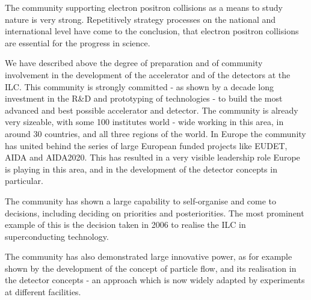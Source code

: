 \documentclass[%
 reprint,
 amsmath,amssymb,
 aps,
]{revtex4-1}
\begin{document}
The community supporting electron positron collisions as a means to study nature is very strong. Repetitively strategy processes on the national and international level have come to the conclusion, that electron positron collisions are essential for the progress in science. 

We have described above the degree of preparation and of community involvement in the development of the accelerator and of the detectors at the ILC. This community is strongly committed - as shown by a decade long investment in the R\&D and prototyping of technologies - to build the most advanced and best possible accelerator and detector. The community is already very sizeable, with some 100 institutes world - wide working in this area, in around 30 countries, and all three regions of the world. In Europe the community has united behind the series of large European funded projects like EUDET, AIDA and AIDA2020. This has resulted in a very visible leadership role Europe is playing in this area, and in the development of the detector concepts in particular. 

The community has shown a large capability to self-organise and come to decisions, including deciding on priorities and posteriorities. The most prominent example of this is the decision taken in 2006 to realise the ILC in superconducting technology. 

The community has also demonstrated large innovative power, as for example shown by the development of the concept of particle flow, and its realisation in the detector concepts - an approach which is now widely adapted by experiments at different facilities. 
\end{document}
